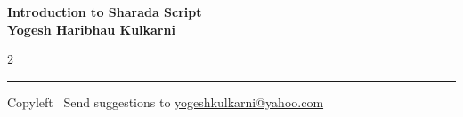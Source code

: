 \documentclass[9pt,a4paper,landscape]{article}
\begin{document}
\footnotesize


\begin{center}
\Large{\textbf{Introduction to Sharada Script\\ Yogesh Haribhau Kulkarni}}  
\end{center}

\begin{multicols}{2}

\end{multicols}

\rule{\linewidth}{0.25pt}
\scriptsize
Copyleft \textcopyleft\  Send suggestions to 
\href{http://www.yogeshkulkarni.com}{yogeshkulkarni@yahoo.com}
\end{document}
